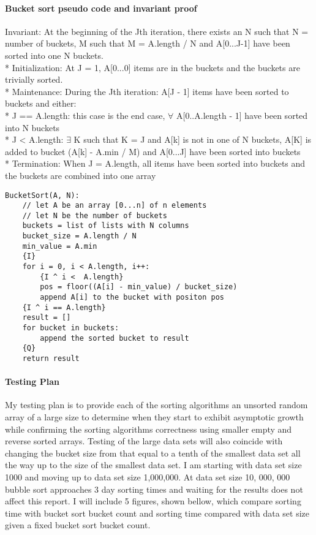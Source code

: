 \documentclass[10pt,letterpaper]{report}
\begin{document}
	\paragraph{Bucket sort pseudo code and invariant proof}
		Invariant: At the beginning of the Jth iteration, there exists an N such that N = number of buckets, M such that M = A.length / N and A[0...J-1] have been sorted into one N buckets. 
		\\* Initialization:  At J = 1, A[0...0] items are in the buckets and the buckets are trivially sorted. 
		\\* Maintenance: During the Jth iteration: A[J - 1] items have been sorted to buckets and either:
		\\* J == A.length: this case is the end case, $ \forall $ A[0..A.length - 1] have been sorted into N buckets
		\\* J < A.length: $ \exists $ K such that K = J and A[k] is not in one of N buckets, A[K] is added to bucket (A[k] - A.min / M) and A[0...J] have been sorted into buckets
		\\* Termination: When J = A.length, all items have been sorted into buckets and the buckets are combined into one array
		\begin{lstlisting}
BucketSort(A, N):
	// let A be an array [0...n] of n elements
	// let N be the number of buckets
	buckets = list of lists with N columns
	bucket_size = A.length / N
	min_value = A.min
	{I}
	for i = 0, i < A.length, i++:
		{I ^ i <  A.length}
		pos = floor((A[i] - min_value) / bucket_size)
		append A[i] to the bucket with positon pos
	{I ^ i == A.length}
	result = []
	for bucket in buckets:
		append the sorted bucket to result
	{Q}
	return result
\end{lstlisting}


\paragraph{Testing Plan}
My testing plan is to provide each of the sorting algorithms an unsorted random array of a large size to determine when they start to exhibit asymptotic growth while confirming the sorting algorithms correctness using smaller empty and reverse sorted arrays. Testing of the large data sets will also coincide with changing the bucket size from that equal to a tenth of the smallest data set all the way up to the size of the smallest data set. I am starting with data set size 1000 and moving up to data set size 1,000,000. At data set size 10, 000, 000 bubble sort approaches 3 day sorting times and waiting for the results does not affect this report. I will include 5 figures, shown bellow, which compare sorting time with bucket sort bucket count and sorting time compared with data set size given a fixed bucket sort bucket count. 
\end{document}
